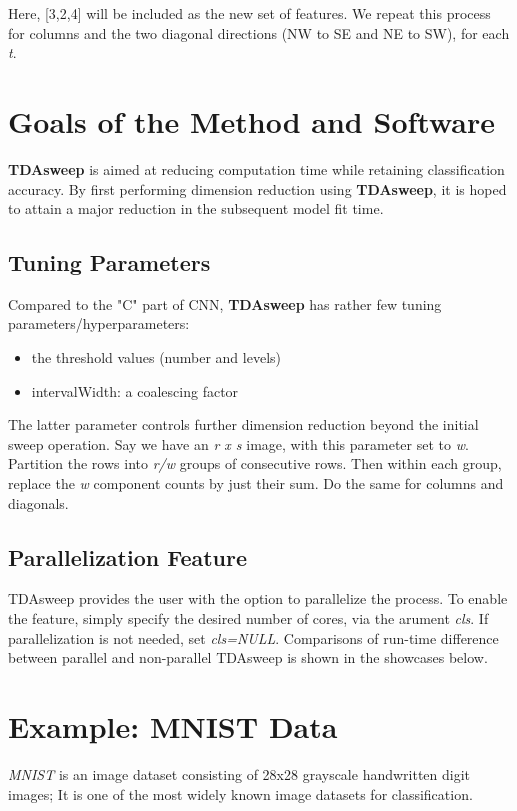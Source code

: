 \documentclass{article}
\begin{document}
Here, [3,2,4] will be included as the new set of features. We repeat this process for columns and the two diagonal directions (NW to SE and NE to SW), for each \emph{t}.

\section{Goals of the Method and Software}
\textbf{TDAsweep} is aimed at reducing computation time while retaining classification accuracy. By first performing dimension reduction using \textbf{TDAsweep}, it is hoped to attain a major reduction in the subsequent model fit time.

\subsection*{Tuning Parameters}
Compared to the "C" part of CNN, \textbf{TDAsweep} has rather few tuning parameters/hyperparameters:

\begin{itemize}
    \item the threshold values (number and levels)
    \item intervalWidth: a coalescing factor
    
\end{itemize}
The latter parameter controls further dimension reduction beyond the initial sweep operation. Say we have an \emph{r x s} image, with this parameter set to \emph{w}. Partition the rows into \emph{r/w} groups of consecutive rows. Then within each group, replace the \emph{w} component counts by just their sum. Do the same for columns and diagonals.


\subsection{Parallelization Feature}
TDAsweep provides the user with the option to parallelize the process. To enable the feature, simply specify the desired number of cores, via the arument \emph{cls}. If parallelization is not needed, set \emph{cls=NULL}. Comparisons of run-time difference between parallel and non-parallel TDAsweep is shown in the showcases below.


\section{Example: MNIST Data}

\emph{MNIST} is an image dataset consisting of 28x28 grayscale handwritten digit images; It is one of the most widely known image datasets for classification.
\end{document}
